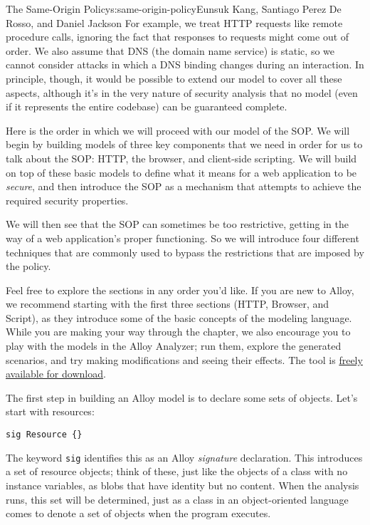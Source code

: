 \begin{aosachapter}{The Same-Origin Policy}{s:same-origin-policy}{Eunsuk Kang, Santiago Perez De Rosso, and Daniel Jackson}
For example, we treat HTTP requests like remote procedure calls,
ignoring the fact that responses to requests might come out of order. We
also assume that DNS (the domain name service) is static, so we cannot
consider attacks in which a DNS binding changes during an interaction.
In principle, though, it would be possible to extend our model to cover
all these aspects, although it's in the very nature of security analysis
that no model (even if it represents the entire codebase) can be
guaranteed complete.

\label{roadmap}

Here is the order in which we will proceed with our model of the SOP. We
will begin by building models of three key components that we need in
order for us to talk about the SOP: HTTP, the browser, and client-side
scripting. We will build on top of these basic models to define what it
means for a web application to be \emph{secure}, and then introduce the
SOP as a mechanism that attempts to achieve the required security
properties.

We will then see that the SOP can sometimes be too restrictive, getting
in the way of a web application's proper functioning. So we will
introduce four different techniques that are commonly used to bypass the
restrictions that are imposed by the policy.

Feel free to explore the sections in any order you'd like. If you are
new to Alloy, we recommend starting with the first three sections (HTTP,
Browser, and Script), as they introduce some of the basic concepts of
the modeling language. While you are making your way through the
chapter, we also encourage you to play with the models in the Alloy
Analyzer; run them, explore the generated scenarios, and try making
modifications and seeing their effects. The tool is
\href{http://alloy.mit.edu}{freely available for download}.

\label{model-of-the-web}

\label{http}

The first step in building an Alloy model is to declare some sets of
objects. Let's start with resources:

\begin{verbatim}
sig Resource {}
\end{verbatim}

The keyword \texttt{sig} identifies this as an Alloy \emph{signature}
declaration. This introduces a set of resource objects; think of these,
just like the objects of a class with no instance variables, as blobs
that have identity but no content. When the analysis runs, this set will
be determined, just as a class in an object-oriented language comes to
denote a set of objects when the program executes.


\end{aosachapter}
